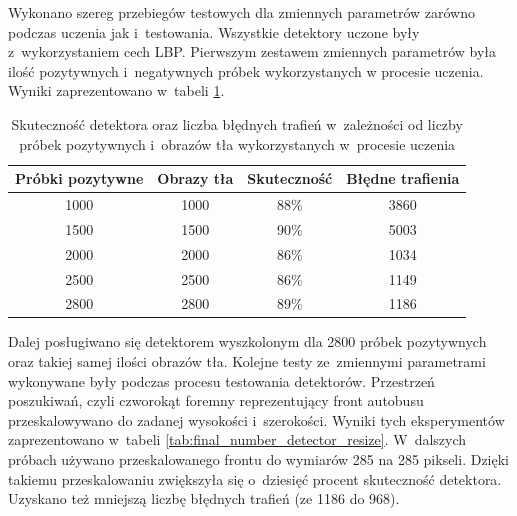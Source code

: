 Wykonano szereg przebiegów testowych dla zmiennych parametrów zarówno
podczas uczenia jak i~testowania. Wszystkie detektory uczone były
z~wykorzystaniem cech LBP. Pierwszym zestawem zmiennych parametrów
była ilość pozytywnych i~negatywnych próbek wykorzystanych w procesie
uczenia. Wyniki zaprezentowano w~tabeli 
\ref{tab:final_number_detector_numposneg}.

\begin{table}[!h]
    \centering
    \begin{tabular}{c|c|c|c}
        Próbki pozytywne & Obrazy tła & Skuteczność & Błędne trafienia
        \\ \hline
        1000 & 1000 & 88\% & 3860 \\
        1500 & 1500 & 90\% & 5003 \\
        2000 & 2000 & 86\% & 1034 \\
        2500 & 2500 & 86\% & 1149 \\
        2800 & 2800 & 89\% & 1186 \\
    \end{tabular}
    \caption{Skuteczność detektora oraz liczba błędnych trafień
    w~zależności od liczby próbek pozytywnych i~obrazów tła
wykorzystanych w~procesie uczenia}
    \label{tab:final_number_detector_numposneg}
\end{table}

Dalej posługiwano się detektorem wyszkolonym dla 2800 próbek pozytywnych
oraz takiej samej ilości obrazów tła. Kolejne testy ze~zmiennymi
parametrami
wykonywane były podczas procesu testowania detektorów. 
Przestrzeń poszukiwań, czyli czworokąt foremny reprezentujący
front autobusu przeskalowywano do zadanej wysokości i~szerokości.
Wyniki tych eksperymentów zaprezentowano w~tabeli 
\ref{tab:final_number_detector_resize}.
W~dalszych próbach używano przeskalowanego frontu do wymiarów
285 na 285 pikseli. Dzięki takiemu przeskalowaniu zwiększyła
się o~dziesięć procent skuteczność detektora. Uzyskano też
mniejszą liczbę błędnych trafień (ze 1186 do 968).

